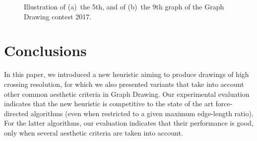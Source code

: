 \documentclass{comjnl}
\begin{document}
\begin{figure}[t]
	\centering

	\caption{Illustration of 
	(a)~the 5th, and of
	(b)~the 9th graph of the Graph Drawing contest 2017.}
	\label{fig:graph5And9-yfiles}
\end{figure}

\section{Conclusions}
\label{sec:conclusions}

In this paper, we introduced a new heuristic aiming to produce drawings of high crossing resolution, for which we also presented variants that take into account other common aesthetic criteria in Graph Drawing. Our experimental evaluation indicates that the new heuristic is competitive to the state of the art force-directed algorithms (even when restricted to a given maximum edge-length ratio). For the latter algorithms, our evaluation indicates that their performance is good, only when several aesthetic criteria are taken into account.
\end{document}

